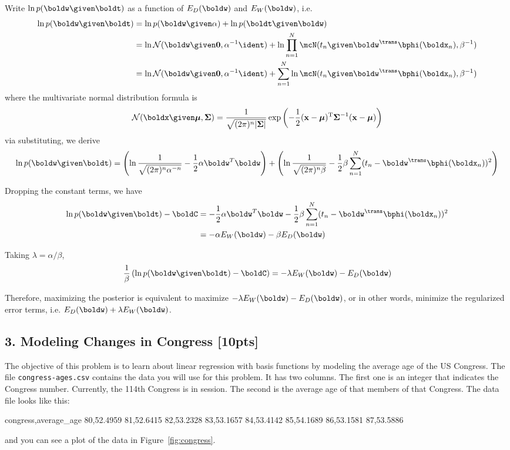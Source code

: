 \documentclass[submit]{harvardml}
\begin{document}
Write $\ln p(\boldw \given \boldt)$ as a function of $E_D(\boldw)$ and $E_W(\boldw)$, i.e.
\begin{align*}
  \ln p(\boldw \given \boldt) &= \ln p(\boldw \given \alpha) + \ln p(\boldt \given \boldw) \\
  &= \ln \mathcal{N}(\boldw \given \bold0, \alpha^{-1}\ident) + \ln \prod_{n=1}^N \mcN(t_n \given \boldw^\trans \bphi(\boldx_n), \beta^{-1}) \\
  &= \ln \mathcal{N}(\boldw \given \bold0, \alpha^{-1}\ident) + \sum_{n=1}^N \ln \mcN(t_n \given \boldw^\trans \bphi(\boldx_n), \beta^{-1})
\end{align*}
where the multivariate normal distribution formula is 
$$
\mathcal{N}(\boldx \given \boldsymbol\mu, \boldsymbol\Sigma) = \frac{1}{\sqrt{(2\pi)^{n}|\boldsymbol\Sigma|}}
\exp\left(-\frac{1}{2}({\mathbf x}-{\boldsymbol\mu})^\mathrm{T}{\boldsymbol\Sigma}^{-1}({\mathbf x}-{\boldsymbol\mu})
\right)
$$
via substituting, we derive
\begin{align*}
  \ln p(\boldw \given \boldt) = \left(\ln \frac{1}{\sqrt{(2\pi)^{n}\alpha^{-n}}} - \frac{1}{2}\alpha\boldw^T\boldw \right) + \left(\ln \frac{1}{\sqrt{(2\pi)^{n}\beta}} - \frac{1}{2}\beta\sum_{n = 1}^N (t_n - \boldw^\trans \bphi(\boldx_n))^2 \right)
\end{align*}

Dropping the constant terms, we have
\begin{align*}
  \ln p(\boldw \given \boldt) - \boldC &= - \frac{1}{2}\alpha\boldw^T\boldw - \frac{1}{2}\beta\sum_{n = 1}^N (t_n - \boldw^\trans \bphi(\boldx_n))^2 \\
  &= -\alpha E_W(\boldw) - \beta E_D(\boldw)
\end{align*}

Taking $\lambda = \alpha / \beta$, 
$$
\frac{1}{\beta}\left(\ln p(\boldw \given \boldt) - \boldC\right) = -\lambda E_W(\boldw) - E_D(\boldw)
$$

Therefore, maximizing the posterior is equivalent to maximize $-\lambda E_W(\boldw) - E_D(\boldw)$, or in other words, minimize the regularized error terms, i.e. $E_D(\boldw) + \lambda E_W(\boldw)$.

\newpage
\subsection*{3. Modeling Changes in Congress [10pts]}
 The objective of this problem is to learn about linear regression with basis
 functions by modeling the average age of the US Congress. The file
 \verb|congress-ages.csv| contains the data you will use for this problem.  It
 has two columns.  The first one is an integer that indicates the Congress
 number. Currently, the 114th Congress is in session. The second is the average
 age of that members of that Congress.  The data file looks like this:
\begin{csv}
congress,average_age
80,52.4959
81,52.6415
82,53.2328
83,53.1657
84,53.4142
85,54.1689
86,53.1581
87,53.5886
\end{csv}
and you can see a plot of the data in Figure~\ref{fig:congress}.
\end{document}
